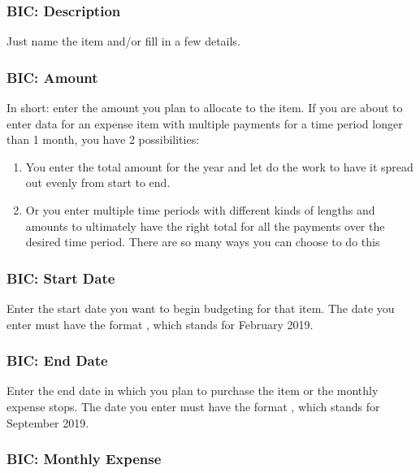 \subsubsection{BIC: Description}
\label{subsubsec:budgeting-item-column-description}

Just name the item and/or fill in a few details.

\subsubsection{BIC: Amount}
\label{subsubsec:budgeting-item-column-amount}

In short: enter the amount you plan to allocate to the item.
If you are about to enter data for an expense item with multiple payments for a time period longer than 1 month, you have 2 possibilities:
\begin{enumerate}
	\item You enter the total amount for the year and let \tfn do the work to have it spread out evenly from start to end.
	\item Or you enter multiple time periods with different kinds of lengths and amounts to ultimately have the right total for all the payments over the desired time period.
	There are so many ways you can choose to do this
\end{enumerate}

\subsubsection{BIC: Start Date}
\label{subsubsec:budgeting-item-column-start-date}

Enter the start date you want to begin budgeting for that item.
The date you enter must have the format , \eg {} which stands for February 2019.

\subsubsection{BIC: End Date}
\label{subsubsec:budgeting-item-column-end-date}

Enter the end date in which you plan to purchase the item or the monthly expense stops.
The date you enter must have the format , \eg {} which stands for September 2019.

\subsubsection{BIC: Monthly Expense}
\label{subsubsec:budgeting-item-column-monthly-expense}

